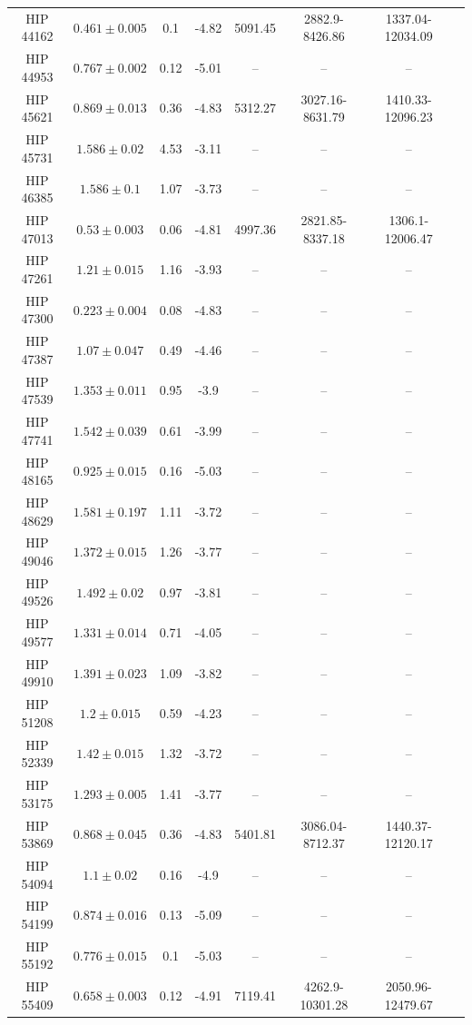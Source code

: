 \begin{longtable}{|c|c|c|c|c|c|c|c|}
HIP 44162 & $ 0.461 \pm 0.005 $ & 0.1 & -4.82 & 5091.45 & 2882.9-8426.86 & 1337.04-12034.09 \\
HIP 44953 & $ 0.767 \pm 0.002 $ & 0.12 & -5.01 &-- &-- &-- \\
HIP 45621 & $ 0.869 \pm 0.013 $ & 0.36 & -4.83 & 5312.27 & 3027.16-8631.79 & 1410.33-12096.23 \\
HIP 45731 & $ 1.586 \pm 0.02 $ & 4.53 & -3.11 &-- &-- &-- \\
HIP 46385 & $ 1.586 \pm 0.1 $ & 1.07 & -3.73 &-- &-- &-- \\
HIP 47013 & $ 0.53 \pm 0.003 $ & 0.06 & -4.81 & 4997.36 & 2821.85-8337.18 & 1306.1-12006.47 \\
HIP 47261 & $ 1.21 \pm 0.015 $ & 1.16 & -3.93 &-- &-- &-- \\
HIP 47300 & $ 0.223 \pm 0.004 $ & 0.08 & -4.83 &-- &-- &-- \\
HIP 47387 & $ 1.07 \pm 0.047 $ & 0.49 & -4.46 &-- &-- &-- \\
HIP 47539 & $ 1.353 \pm 0.011 $ & 0.95 & -3.9 &-- &-- &-- \\
HIP 47741 & $ 1.542 \pm 0.039 $ & 0.61 & -3.99 &-- &-- &-- \\
HIP 48165 & $ 0.925 \pm 0.015 $ & 0.16 & -5.03 &-- &-- &-- \\
HIP 48629 & $ 1.581 \pm 0.197 $ & 1.11 & -3.72 &-- &-- &-- \\
HIP 49046 & $ 1.372 \pm 0.015 $ & 1.26 & -3.77 &-- &-- &-- \\
HIP 49526 & $ 1.492 \pm 0.02 $ & 0.97 & -3.81 &-- &-- &-- \\
HIP 49577 & $ 1.331 \pm 0.014 $ & 0.71 & -4.05 &-- &-- &-- \\
HIP 49910 & $ 1.391 \pm 0.023 $ & 1.09 & -3.82 &-- &-- &-- \\
HIP 51208 & $ 1.2 \pm 0.015 $ & 0.59 & -4.23 &-- &-- &-- \\
HIP 52339 & $ 1.42 \pm 0.015 $ & 1.32 & -3.72 &-- &-- &-- \\
HIP 53175 & $ 1.293 \pm 0.005 $ & 1.41 & -3.77 &-- &-- &-- \\
HIP 53869 & $ 0.868 \pm 0.045 $ & 0.36 & -4.83 & 5401.81 & 3086.04-8712.37 & 1440.37-12120.17 \\
HIP 54094 & $ 1.1 \pm 0.02 $ & 0.16 & -4.9 &-- &-- &-- \\
HIP 54199 & $ 0.874 \pm 0.016 $ & 0.13 & -5.09 &-- &-- &-- \\
HIP 55192 & $ 0.776 \pm 0.015 $ & 0.1 & -5.03 &-- &-- &-- \\
HIP 55409 & $ 0.658 \pm 0.003 $ & 0.12 & -4.91 & 7119.41 & 4262.9-10301.28 & 2050.96-12479.67 \\

\end{longtable}
